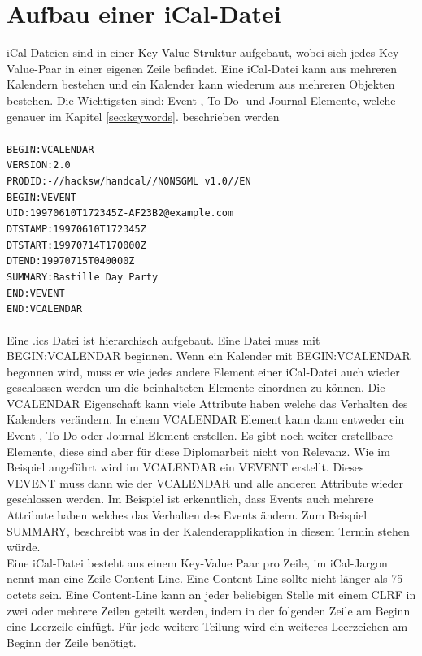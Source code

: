 \section{Aufbau einer iCal-Datei}
\label{sec:aufbauEineriCalDatei}
iCal-Dateien sind in einer Key-Value-Struktur aufgebaut, wobei sich jedes Key-Value-Paar in einer eigenen Zeile befindet. Eine iCal-Datei kann aus mehreren Kalendern bestehen und ein Kalender kann wiederum aus mehreren Objekten bestehen. Die Wichtigsten sind: Event-, To-Do- und Journal-Elemente, welche genauer im Kapitel \ref{sec:keywords}. beschrieben werden\\\\
\texttt{BEGIN:VCALENDAR\\
 VERSION:2.0\\
 PRODID:-//hacksw/handcal//NONSGML v1.0//EN\\
 BEGIN:VEVENT\\
 UID:19970610T172345Z-AF23B2@example.com\\
 DTSTAMP:19970610T172345Z\\
 DTSTART:19970714T170000Z\\
 DTEND:19970715T040000Z\\
 SUMMARY:Bastille Day Party\\
 END:VEVENT\\
 END:VCALENDAR}\\\\
Eine .ics Datei ist hierarchisch aufgebaut. Eine Datei muss mit BEGIN:VCALENDAR beginnen. Wenn ein Kalender mit BEGIN:VCALENDAR begonnen wird, muss er wie jedes andere Element einer iCal-Datei auch wieder geschlossen werden um die beinhalteten Elemente einordnen zu können. Die VCALENDAR Eigenschaft kann viele Attribute haben welche das Verhalten des Kalenders verändern.  In einem VCALENDAR Element kann dann entweder ein Event-, To-Do oder Journal-Element erstellen. Es gibt noch weiter erstellbare Elemente, diese sind aber für diese Diplomarbeit nicht von Relevanz. Wie im Beispiel angeführt wird im VCALENDAR ein VEVENT erstellt. Dieses VEVENT muss dann wie der VCALENDAR und alle anderen Attribute wieder geschlossen werden. Im Beispiel ist erkenntlich, dass Events auch mehrere Attribute haben welches das Verhalten des Events ändern. Zum Beispiel SUMMARY, beschreibt was in der Kalenderapplikation in diesem Termin stehen würde.\\
Eine iCal-Datei besteht aus einem Key-Value Paar pro Zeile, im iCal-Jargon nennt man eine Zeile Content-Line. Eine Content-Line sollte nicht länger als 75 octets sein. Eine Content-Line kann an jeder beliebigen Stelle mit einem CLRF in zwei oder mehrere Zeilen geteilt werden, indem in der folgenden Zeile am Beginn eine Leerzeile einfügt. Für jede weitere Teilung wird ein weiteres Leerzeichen am Beginn der Zeile benötigt. \\\\
